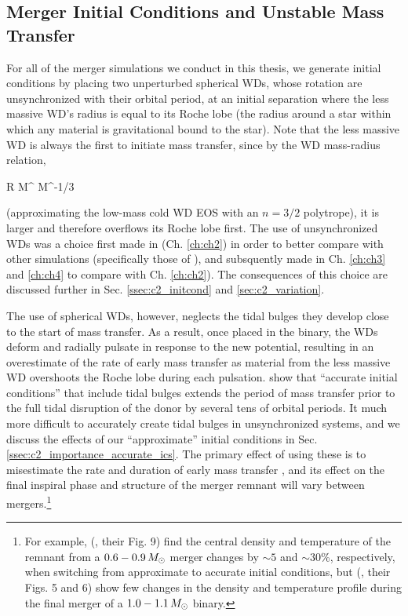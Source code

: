 

\subsection{Merger Initial Conditions and Unstable Mass Transfer}
\label{ssec:c1_stable_mass_transfer}

For all of the merger simulations we conduct in this thesis, we generate initial conditions by placing two unperturbed spherical WDs, whose rotation are unsynchronized with their orbital period, at an initial separation where the less massive WD's radius is equal to its Roche lobe (the radius around a star within which any material is gravitational bound to the star).  Note that the less massive WD is always the first to initiate mass transfer, since by the WD mass-radius relation,

\eqbegin
R \propto M^{} \approx M^{-1/3}
\label{eq:c1_massradiusrelation}
\eqend

\noindent (approximating the low-mass cold WD EOS with an $n = 3/2$ polytrope), it is larger and therefore overflows its Roche lobe first.  The use of unsynchronized WDs was a choice first made in \cite{zhu+13} (Ch. \ref{ch:ch2}) in order to better compare with other simulations (specifically those of \citealt{loreig09}), and subsquently made in Ch. \ref{ch:ch3} and \ref{ch:ch4} to compare with Ch. \ref{ch:ch2}).  The consequences of this choice are discussed further in Sec. \ref{ssec:c2_initcond} and \ref{sec:c2_variation}.  

The use of spherical WDs, however, neglects the tidal bulges they develop close to the start of mass transfer.  As a result, once placed in the binary, the WDs deform and radially pulsate in response to the new potential, resulting in an overestimate of the rate of early mass transfer as material from the less massive WD overshoots the Roche lobe during each pulsation.  \cite{dan+11} show that ``accurate initial conditions'' that include tidal bulges extends the period of mass transfer prior to the full tidal disruption of the donor by several tens of orbital periods.  It much more difficult to accurately create tidal bulges in unsynchronized systems, and we discuss the effects of our ``approximate'' initial conditions in Sec. \ref{ssec:c2_importance_accurate_ics}.  The primary effect of using these is to misestimate the rate and duration of early mass transfer \citep{dsou+06, dan+11}, and its effect on the final inspiral phase and structure of the merger remnant will vary between mergers.\footnote{For example, \citeauthor{dan+11} (\citeyear{dan+11}, their Fig. 9) find the central density and temperature of the remnant from a $0.6-0.9\,\Msun$ merger changes by $\sim5$ and $\sim30$\%, respectively, when switching from approximate to accurate initial conditions, but \citeauthor{pakm+12sph} (\citeyear{pakm+12sph}, their Figs. 5 and 6) show few changes in the density and temperature profile during the final merger of a $1.0 - 1.1\,\Msun$ binary.}

